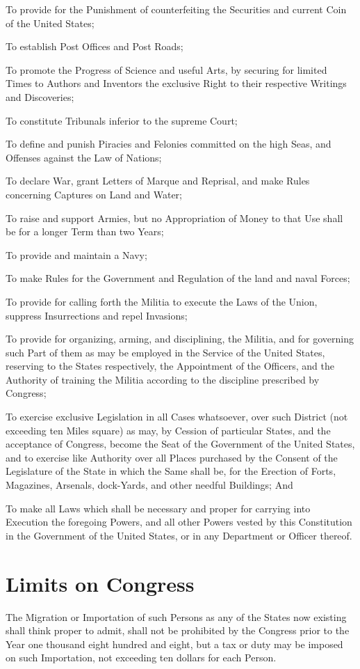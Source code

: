 \documentclass{constitution}
\begin{document}
To provide for the Punishment of counterfeiting
the Securities and current Coin of the United States;

To establish Post Offices and Post Roads;

To promote the Progress of Science and useful Arts,
by securing for limited Times to Authors and Inventors
the exclusive Right to their respective Writings and Discoveries;

To constitute Tribunals inferior to the supreme Court;

To define and punish Piracies and Felonies committed on the high Seas,
and Offenses against the Law of Nations;

To declare War, grant Letters of Marque and Reprisal,
and make Rules concerning Captures on Land and Water;

To raise and support Armies,
but no Appropriation of Money to that Use shall be for a longer Term than two Years;

To provide and maintain a Navy;

To make Rules for the Government and Regulation of the land and naval Forces;

To provide for calling forth the Militia to execute the Laws of the Union,
suppress Insurrections and repel Invasions;

To provide for organizing, arming, and disciplining, the Militia,
and for governing such Part of them as may be employed in the Service of the United States,
reserving to the States respectively, the Appointment of the Officers,
and the Authority of training the Militia according to the discipline prescribed by Congress;

To exercise exclusive Legislation in all Cases whatsoever,
over such District (not exceeding ten Miles square) as may,
by Cession of particular States, and the acceptance of Congress,
become the Seat of the Government of the United States,
and to exercise like Authority over all Places
purchased by the Consent of the Legislature of the State in which the Same shall be,
for the Erection of Forts, Magazines, Arsenals, dock-Yards, and other needful Buildings; And

To make all Laws which shall be necessary and proper
for carrying into Execution the foregoing Powers,
and all other Powers vested by this Constitution in the Government of the United States,
or in any Department or Officer thereof.

\section{Limits on Congress}
The Migration or Importation of such Persons
as any of the States now existing shall think proper to admit,
shall not be prohibited by the Congress prior to the Year one thousand eight hundred and eight,
but a tax or duty may be imposed on such Importation,
not exceeding ten dollars for each Person.
\end{document}
